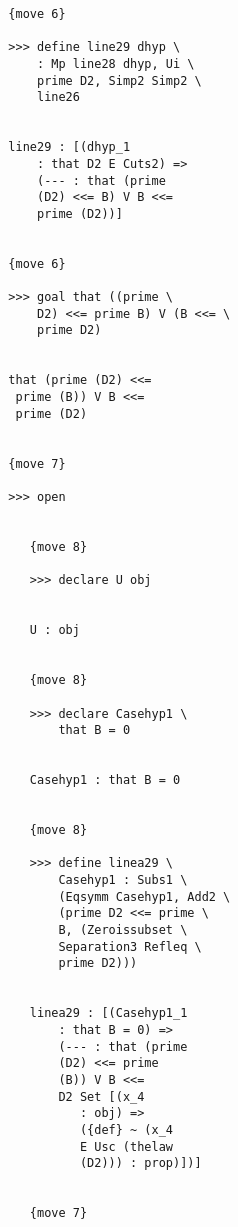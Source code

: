 \documentclass[12pt]{article}
\begin{document}
\begin{verbatim}
                     {move 6}

                     >>> define line29 dhyp \
                         : Mp line28 dhyp, Ui \
                         prime D2, Simp2 Simp2 \
                         line26


                     line29 : [(dhyp_1 
                         : that D2 E Cuts2) => 
                         (--- : that (prime 
                         (D2) <<= B) V B <<= 
                         prime (D2))]


                     {move 6}

                     >>> goal that ((prime \
                         D2) <<= prime B) V (B <<= \
                         prime D2)


                     that (prime (D2) <<= 
                      prime (B)) V B <<= 
                      prime (D2)


                     {move 7}

                     >>> open


                        {move 8}

                        >>> declare U obj


                        U : obj


                        {move 8}

                        >>> declare Casehyp1 \
                            that B = 0


                        Casehyp1 : that B = 0


                        {move 8}

                        >>> define linea29 \
                            Casehyp1 : Subs1 \
                            (Eqsymm Casehyp1, Add2 \
                            (prime D2 <<= prime \
                            B, (Zeroissubset \
                            Separation3 Refleq \
                            prime D2)))


                        linea29 : [(Casehyp1_1 
                            : that B = 0) => 
                            (--- : that (prime 
                            (D2) <<= prime 
                            (B)) V B <<= 
                            D2 Set [(x_4 
                               : obj) => 
                               ({def} ~ (x_4 
                               E Usc (thelaw 
                               (D2))) : prop)])]


                        {move 7}


\end{verbatim}
\end{document}
